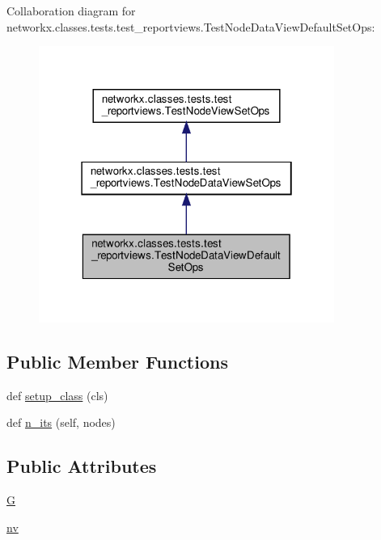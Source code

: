 Collaboration diagram for networkx.\+classes.\+tests.\+test\+\_\+reportviews.\+Test\+Node\+Data\+View\+Default\+Set\+Ops\+:
\nopagebreak
\begin{figure}[H]
\begin{center}
\leavevmode
\includegraphics[width=274pt]{classnetworkx_1_1classes_1_1tests_1_1test__reportviews_1_1TestNodeDataViewDefaultSetOps__coll__graph}
\end{center}
\end{figure}
\subsection*{Public Member Functions}
\begin{DoxyCompactItemize}
\item 
def \hyperlink{classnetworkx_1_1classes_1_1tests_1_1test__reportviews_1_1TestNodeDataViewDefaultSetOps_a1efe6496e68000cde4b864c3829fb227}{setup\+\_\+class} (cls)
\item 
def \hyperlink{classnetworkx_1_1classes_1_1tests_1_1test__reportviews_1_1TestNodeDataViewDefaultSetOps_a3940e949292de72d5f814c5f9faf4de1}{n\+\_\+its} (self, nodes)
\end{DoxyCompactItemize}
\subsection*{Public Attributes}
\begin{DoxyCompactItemize}
\item 
\hyperlink{classnetworkx_1_1classes_1_1tests_1_1test__reportviews_1_1TestNodeDataViewDefaultSetOps_a6264f6ff5a8b4bcba9d10d5afd367006}{G}
\item 
\hyperlink{classnetworkx_1_1classes_1_1tests_1_1test__reportviews_1_1TestNodeDataViewDefaultSetOps_a9335abddabd89e7ee6e9145623bb36f1}{nv}
\end{DoxyCompactItemize}



